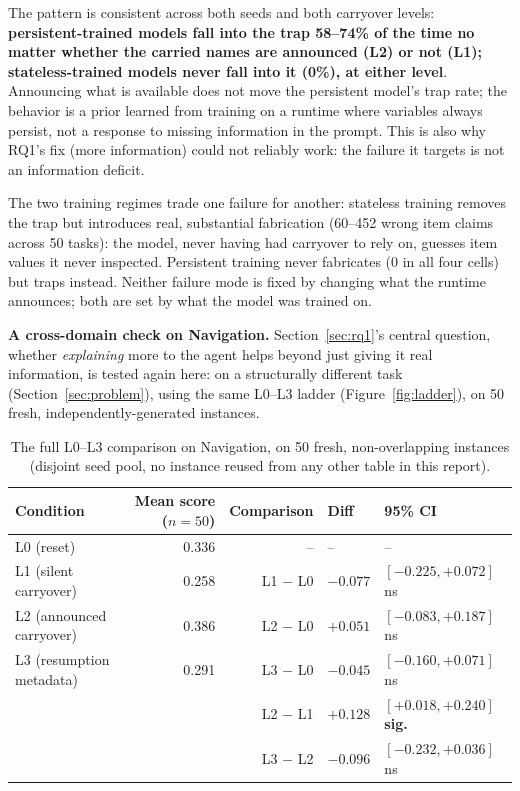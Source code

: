 \documentclass[11pt,a4paper]{article}
\newcommand{\cell}[1]{\textbf{#1}}
\begin{document}
The pattern is consistent across both seeds and both carryover levels: \textbf{persistent-trained
models fall into the trap 58--74\% of the time no matter whether the carried names are announced
(L2) or not (L1); stateless-trained models never fall into it (0\%), at either level}. Announcing
what is available does not move the persistent model's trap rate; the behavior is a prior
learned from training on a runtime where variables always persist, not a response to missing
information in the prompt. This is also why RQ1's fix (more information) could not reliably
work: the failure it targets is not an information deficit.

The two training regimes trade one failure for another: stateless training removes the trap but
introduces real, substantial fabrication (60--452 wrong item claims across 50 tasks): the
model, never having had carryover to rely on, guesses item values it never inspected. Persistent
training never fabricates (0 in all four cells) but traps instead. Neither failure mode is fixed
by changing what the runtime announces; both are set by what the model was trained on.

\textbf{A cross-domain check on Navigation.} Section~\ref{sec:rq1}'s central question, whether
\emph{explaining} more to the agent helps beyond just giving it real information, is tested
again here: on a structurally different task (Section~\ref{sec:problem}), using the same L0--L3
ladder (Figure~\ref{fig:ladder}), on 50 fresh, independently-generated instances.

\begin{table}[H]
\centering
\small
\begin{tabular}{@{}lrrll@{}}
\toprule
\cell{Condition} & \cell{Mean score ($n=50$)} & \cell{Comparison} & \cell{Diff} & \cell{95\% CI} \\
\midrule
L0 (reset)                  & 0.336 & -- & -- & -- \\
L1 (silent carryover)       & 0.258 & L1 $-$ L0 & $-0.077$ & $[-0.225,+0.072]$ \quad ns \\
L2 (announced carryover)    & 0.386 & L2 $-$ L0 & $+0.051$ & $[-0.083,+0.187]$ \quad ns \\
L3 (resumption metadata)    & 0.291 & L3 $-$ L0 & $-0.045$ & $[-0.160,+0.071]$ \quad ns \\
                             &       & L2 $-$ L1 & $+0.128$ & $[+0.018,+0.240]$ \quad\textbf{sig.} \\
                             &       & L3 $-$ L2 & $-0.096$ & $[-0.232,+0.036]$ \quad ns \\
\bottomrule
\end{tabular}
\caption{The full L0--L3 comparison on Navigation, on 50 fresh, non-overlapping instances
(disjoint seed pool, no instance reused from any other table in this report).}
\label{tab:nav-rep50}
\end{table}
\end{document}
